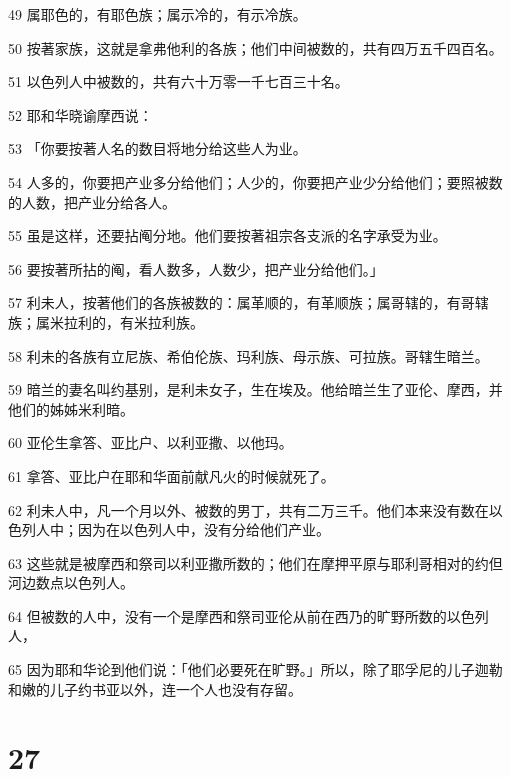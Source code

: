 \par 49 属耶色的，有耶色族；属示冷的，有示冷族。
\par 50 按著家族，这就是拿弗他利的各族；他们中间被数的，共有四万五千四百名。
\par 51 以色列人中被数的，共有六十万零一千七百三十名。
\par 52 耶和华晓谕摩西说：
\par 53 「你要按著人名的数目将地分给这些人为业。
\par 54 人多的，你要把产业多分给他们；人少的，你要把产业少分给他们；要照被数的人数，把产业分给各人。
\par 55 虽是这样，还要拈阄分地。他们要按著祖宗各支派的名字承受为业。
\par 56 要按著所拈的阄，看人数多，人数少，把产业分给他们。」
\par 57 利未人，按著他们的各族被数的：属革顺的，有革顺族；属哥辖的，有哥辖族；属米拉利的，有米拉利族。
\par 58 利未的各族有立尼族、希伯伦族、玛利族、母示族、可拉族。哥辖生暗兰。
\par 59 暗兰的妻名叫约基别，是利未女子，生在埃及。他给暗兰生了亚伦、摩西，并他们的姊姊米利暗。
\par 60 亚伦生拿答、亚比户、以利亚撒、以他玛。
\par 61 拿答、亚比户在耶和华面前献凡火的时候就死了。
\par 62 利未人中，凡一个月以外、被数的男丁，共有二万三千。他们本来没有数在以色列人中；因为在以色列人中，没有分给他们产业。
\par 63 这些就是被摩西和祭司以利亚撒所数的；他们在摩押平原与耶利哥相对的约但河边数点以色列人。
\par 64 但被数的人中，没有一个是摩西和祭司亚伦从前在西乃的旷野所数的以色列人，
\par 65 因为耶和华论到他们说：「他们必要死在旷野。」所以，除了耶孚尼的儿子迦勒和嫩的儿子约书亚以外，连一个人也没有存留。

\chapter{27}

